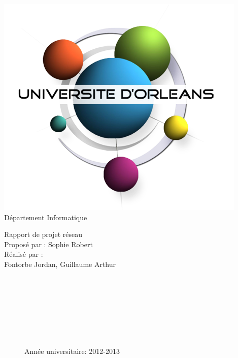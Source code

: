 \documentclass[12pt,a4paper,utf8x]{report}
\begin{document}
\begin{titlepage}
\begin{flushright}
   	\includegraphics[scale=0.30]{univorleans.png}\\ 
   	   	Département Informatique
\end{flushright}
\vspace{30mm}
\begin{center}
\huge{Rapport de projet réseau}\\
\vspace{8mm}
\vspace{3mm}
\large{Proposé par : Sophie Robert}
\vspace{3mm}
\large{\\Réalisé par :}\\
\large{Fontorbe Jordan, Guillaume Arthur}\\
\end{center}
\begin{figure}[b!]
\begin{flushright}
~~\\ ~~\\ ~~\\ ~~\\ ~~\\ ~~\\ ~~\\
\large{Année universitaire: 2012-2013}
\end{flushright}
\end{figure}
\end{titlepage}

\tableofcontents
\clearpage
\end{document}

